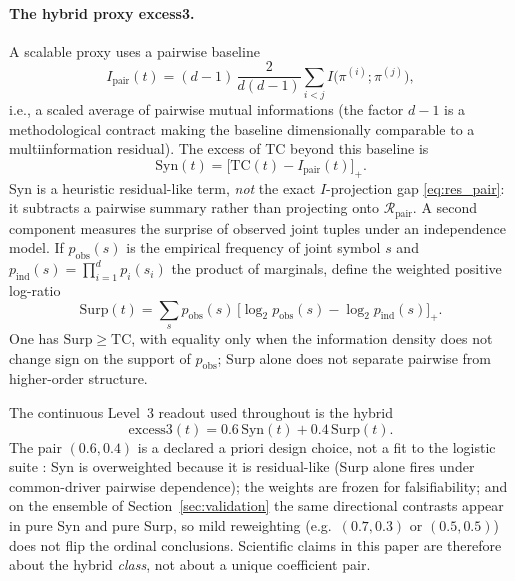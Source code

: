 \documentclass[11pt,a4paper]{article}
\begin{document}
\paragraph{The hybrid proxy excess3.}
A scalable proxy uses a pairwise baseline
\begin{equation}
I_{\mathrm{pair}}(t)
=(d-1)\,
\frac{2}{d(d-1)}
\sum_{i<j} I\bigl(\pi^{(i)};\pi^{(j)}\bigr),
\end{equation}
i.e., a scaled average of pairwise mutual informations (the factor
$d-1$ is a methodological contract making the baseline dimensionally
comparable to a multiinformation residual). The excess of TC beyond this
baseline is
\begin{equation}
\label{eq:syn}
\mathrm{Syn}(t)
=\bigl[\mathrm{TC}(t)-I_{\mathrm{pair}}(t)\bigr]_+.
\end{equation}
Syn is a heuristic residual-like term, \emph{not} the exact $I$-projection
gap \eqref{eq:res_pair}: it subtracts a pairwise summary rather than
projecting onto $\mathcal{R}_{\mathrm{pair}}$. A second component measures
the surprise of observed joint tuples under an independence model. If
$p_{\mathrm{obs}}(s)$ is the empirical frequency of joint symbol $s$ and
$p_{\mathrm{ind}}(s)=\prod_{i=1}^{d}p_i(s_i)$ the product of marginals,
define the weighted positive log-ratio
\begin{equation}
\label{eq:surprise}
\mathrm{Surp}(t)
=\sum_{s} p_{\mathrm{obs}}(s)\,
\bigl[\log_2 p_{\mathrm{obs}}(s)-\log_2 p_{\mathrm{ind}}(s)\bigr]_+.
\end{equation}
One has $\mathrm{Surp}\ge\mathrm{TC}$, with equality only when the
information density does not change sign on the support of
$p_{\mathrm{obs}}$; Surp alone does not separate pairwise from
higher-order structure.

The continuous Level~3 readout used throughout is the hybrid
\begin{equation}
\label{eq:excess3}
\mathrm{excess3}(t)
=0.6\,\mathrm{Syn}(t)+0.4\,\mathrm{Surp}(t).
\end{equation}
The pair $(0.6,0.4)$ is a declared a priori design choice, not a fit to
the logistic suite \cite{Padilla2026nested}: Syn is overweighted because
it is residual-like (Surp alone fires under common-driver pairwise
dependence); the weights are frozen for falsifiability; and on the
ensemble of Section~\ref{sec:validation} the same directional contrasts
appear in pure Syn and pure Surp, so mild reweighting (e.g.\ $(0.7,0.3)$
or $(0.5,0.5)$) does not flip the ordinal conclusions. Scientific claims
in this paper are therefore about the hybrid \emph{class}, not about a
unique coefficient pair.
\end{document}
